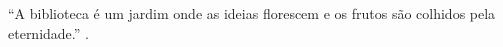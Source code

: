 
\begin{epigrafe}%
%
%
``A biblioteca é um jardim onde as ideias florescem e os frutos são colhidos pela eternidade.'' \cite{Candido2002}.
\end{epigrafe}
